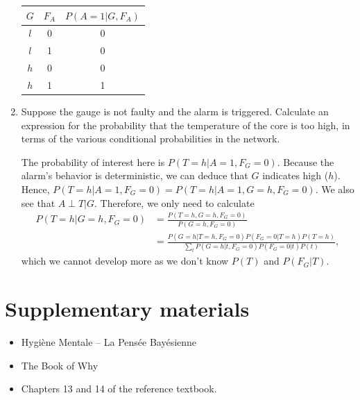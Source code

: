 \documentclass[11pt, a4paper]{article}
\begin{document}
\begin{enumerate}
    \begin{solution}
        \begin{table}[h]
            \centering
            \begin{tabular}{cc|c}
                \toprule
                 $G$ & $F_A$ & $P(A = 1 | G, F_A)$ \\
                 \midrule
                 $l$ & 0 & 0 \\
                 $l$ & 1 & 0 \\
                 $h$ & 0 & 0 \\
                 $h$ & 1 & 1 \\
                 \bottomrule
            \end{tabular}
        \end{table}
    \end{solution}

    \item Suppose the gauge is not faulty and the alarm is triggered. Calculate an expression for the probability that the temperature of the core is too high, in terms of the various conditional probabilities in the network.

    \begin{solution}
        The probability of interest here is $P(T = h | A = 1, F_G = 0)$. Because the alarm's behavior is deterministic, we can deduce that $G$ indicates high ($h$). Hence, $P(T = h | A = 1, F_G = 0) = P(T = h | A = 1, G = h, F_G = 0)$. We also see that $A \perp T | G$. Therefore, we only need to calculate
        \begin{align*}
            P(T = h | G = h, F_G = 0) & = \frac{P(T = h, G = h, F_G = 0)}{P(G = h, F_G = 0)} \\
            & = \frac{P(G = h | T = h, F_G = 0) P(F_G = 0 | T = h) P(T = h)}{\sum_t P(G = h | t, F_G = 0) P(F_G = 0 | t) P(t)} ,
        \end{align*}
        which we cannot develop more as we don't know $P(T)$ and $P(F_G | T)$.
    \end{solution}
\end{enumerate}

\newpage

\section*{Supplementary materials}

\begin{itemize}
    \item Hygiène Mentale -- La Pensée Bayésienne


    \item The Book of Why


    \item Chapters 13 and 14 of the reference textbook.
\end{itemize}
\end{document}
